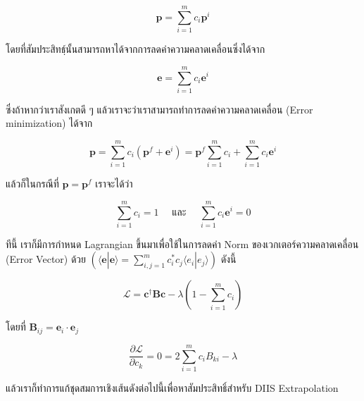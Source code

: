 \begin{equation}
  \mathbf{p} 
  = 
  \sum_{i=1}^{m} c_i \mathbf{p}^i
\end{equation}

\noindent โดยที่สัมประสิทธฺ์นั้นสามารถหาได้จากการลดค่าความคลาดเคลื่อนซึ่งได้จาก 

\begin{equation}
  \mathbf{e} 
  = 
  \sum_{i=1}^{m} c_i \mathbf{e}^i
\end{equation}

\noindent ซึ่งถ้าหากว่าเราสังเกตดี ๆ แล้วเราจะว่าเราสามารถทำการลดค่าความคลาดเคลื่อน (Error minimization) ได้จาก

\begin{equation}
  \mathbf{p} 
  = 
  \sum_{i=1}^{m} c_i \left( \mathbf{p}^f + \mathbf{e}^i\right) 
  = 
  \mathbf{p}^f \sum_{i=1}^{m} c_i  + \sum_{i=1}^{m} c_i \mathbf{e}^i
\end{equation}

\noindent แล้วก็ในกรณีที่ $\mathbf{p} = \mathbf{p}^f$ เราจะได้ว่า 

\begin{equation}
  \sum_{i=1}^{m} c_i = 1
  \quad 
  \text{ และ }
  \quad
  \sum_{i=1}^{m} c_i \mathbf{e}^i = 0
\end{equation}

\noindent ทีนี้ เราก็มีการกำหนด Lagrangian ขึ้นมาเพื่อใช้ในการลดค่า Norm ของเวกเตอร์ความคลาดเคลื่อน (Error Vector) ด้วย 
$(\langle \mathbf{e} | \mathbf{e} \rangle = \sum_{i,j = 1}^{m} c_i^* c_j \langle e_i | e_j \rangle)$ ดังนี้

\begin{equation}
  \mathcal{L} 
  = 
  \mathbf{c}^\dagger \mathbf{B} \mathbf{c} - \lambda \left( 1-\sum_{i=1}^m c_i \right)
\end{equation}

\noindent โดยที่ $\mathbf{B}_{ij} = \mathbf{e}_i \cdot \mathbf{e}_j$

\begin{equation}
  \frac{\partial\mathcal{L}}{\partial c_k} 
  = 
  0 
  = 
  2 \sum_{i=1}^m c_i B_{ki} -\lambda
\end{equation}

\noindent แล้วเราก็ทำการแก้ชุดสมการเชิงเส้นดังต่อไปนี้เพื่อหาสัมประสิทธิ์สำหรับ DIIS Extrapolation

